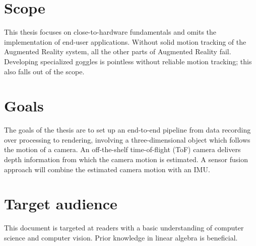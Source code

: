 \section{Scope}
\label{sec:Scope}
This thesis focuses on close-to-hardware fundamentals and omits the implementation of end-user applications. Without solid motion tracking of the Augmented Reality system, all the other parts of Augmented Reality fail. Developing specialized goggles is pointless without reliable motion tracking; this also falls out of the scope.
\section{Goals}
\label{sec:Goals}
The goals of the thesis are to set up an end-to-end pipeline from data recording over processing to rendering, involving a three-dimensional object which follows the motion of a camera. An off-the-shelf time-of-flight (ToF) camera delivers depth information from which the camera motion is estimated. A sensor fusion approach will combine the estimated camera motion with an IMU.

\section{Target audience}
\label{sec:Ziel}
This document is targeted at readers with a basic understanding of computer science and computer vision. Prior knowledge in linear algebra is beneficial.